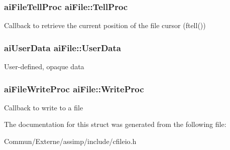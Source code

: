 \subsubsection[{\texorpdfstring{Tell\+Proc}{TellProc}}]{\setlength{\rightskip}{0pt plus 5cm}ai\+File\+Tell\+Proc ai\+File\+::\+Tell\+Proc}\hypertarget{structai_file_aaf2d88a3b2fcbdacf51119658283d27e}{}\label{structai_file_aaf2d88a3b2fcbdacf51119658283d27e}
Callback to retrieve the current position of the file cursor (ftell()) 
\subsubsection[{\texorpdfstring{User\+Data}{UserData}}]{\setlength{\rightskip}{0pt plus 5cm}ai\+User\+Data ai\+File\+::\+User\+Data}\hypertarget{structai_file_aec528fa18f4755fe4f28d604fde28aad}{}\label{structai_file_aec528fa18f4755fe4f28d604fde28aad}
User-\/defined, opaque data 
\subsubsection[{\texorpdfstring{Write\+Proc}{WriteProc}}]{\setlength{\rightskip}{0pt plus 5cm}ai\+File\+Write\+Proc ai\+File\+::\+Write\+Proc}\hypertarget{structai_file_ab9fca3a62e34a33592c13a6f31db7d1d}{}\label{structai_file_ab9fca3a62e34a33592c13a6f31db7d1d}
Callback to write to a file 

The documentation for this struct was generated from the following file\+:\begin{DoxyCompactItemize}
\item 
Commun/\+Externe/assimp/include/cfileio.\+h\end{DoxyCompactItemize}
